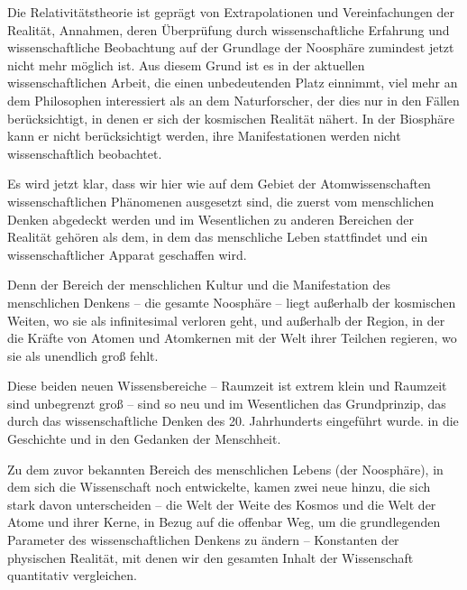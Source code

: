 \documentclass[11pt,a4paper]{book}
\begin{document}
Die Relativitätstheorie ist geprägt von Extrapolationen und Vereinfachungen der Realität, Annahmen, deren Überprüfung durch wissenschaftliche Erfahrung und wissenschaftliche Beobachtung auf der Grundlage der Noosphäre zumindest jetzt nicht mehr möglich ist. Aus diesem Grund ist es in der aktuellen wissenschaftlichen Arbeit, die einen unbedeutenden Platz einnimmt, viel mehr an dem Philosophen interessiert als an dem Naturforscher, der dies nur in den Fällen berücksichtigt, in denen er sich der kosmischen Realität nähert. In der Biosphäre kann er nicht berücksichtigt werden, ihre Manifestationen werden nicht wissenschaftlich beobachtet.



Es wird jetzt klar, dass wir hier wie auf dem Gebiet der Atomwissenschaften wissenschaftlichen Phänomenen ausgesetzt sind, die zuerst vom menschlichen Denken abgedeckt werden und im Wesentlichen zu anderen Bereichen der Realität gehören als dem, in dem das menschliche Leben stattfindet und ein wissenschaftlicher Apparat geschaffen wird.



Denn der Bereich der menschlichen Kultur und die Manifestation des menschlichen Denkens -- die gesamte Noosphäre -- liegt außerhalb der kosmischen Weiten, wo sie als infinitesimal verloren geht, und außerhalb der Region, in der die Kräfte von Atomen und Atomkernen mit der Welt ihrer Teilchen regieren, wo sie als unendlich groß fehlt.



Diese beiden neuen Wissensbereiche -- Raumzeit ist extrem klein und Raumzeit sind unbegrenzt groß -- sind so neu und im Wesentlichen das Grundprinzip, das durch das wissenschaftliche Denken des 20. Jahrhunderts eingeführt wurde. in die Geschichte und in den Gedanken der Menschheit.



Zu dem zuvor bekannten Bereich des menschlichen Lebens (der Noosphäre), in dem sich die Wissenschaft noch entwickelte, kamen zwei neue hinzu, die sich stark davon unterscheiden -- die Welt der Weite des Kosmos und die Welt der Atome und ihrer Kerne, in Bezug auf die offenbar Weg, um die grundlegenden Parameter des wissenschaftlichen Denkens zu ändern -- Konstanten der physischen Realität, mit denen wir den gesamten Inhalt der Wissenschaft quantitativ vergleichen.
\end{document}
